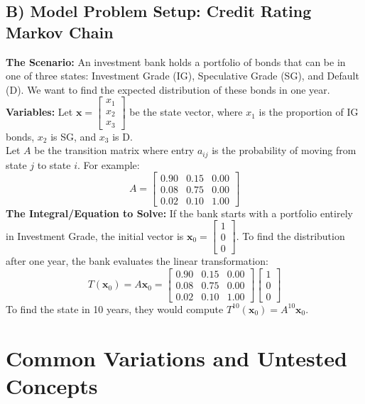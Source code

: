 \documentclass[11pt]{article}
\begin{document}
\subsection{B) Model Problem Setup: Credit Rating Markov Chain}
\textbf{The Scenario:} An investment bank holds a portfolio of bonds that can be in one of three states: Investment Grade (IG), Speculative Grade (SG), and Default (D). We want to find the expected distribution of these bonds in one year.
\textbf{Variables:}
Let $\mathbf{x} = \begin{bmatrix} x_1 \\ x_2 \\ x_3 \end{bmatrix}$ be the state vector, where $x_1$ is the proportion of IG bonds, $x_2$ is SG, and $x_3$ is D. \\
Let $A$ be the transition matrix where entry $a_{ij}$ is the probability of moving from state $j$ to state $i$.
For example:
\[ A = \begin{bmatrix} 0.90 & 0.15 & 0.00 \\ 0.08 & 0.75 & 0.00 \\ 0.02 & 0.10 & 1.00 \end{bmatrix} \]
\textbf{The Integral/Equation to Solve:}
If the bank starts with a portfolio entirely in Investment Grade, the initial vector is $\mathbf{x}_0 = \begin{bmatrix} 1 \\ 0 \\ 0 \end{bmatrix}$. To find the distribution after one year, the bank evaluates the linear transformation:
\[ T(\mathbf{x}_0) = A\mathbf{x}_0 = \begin{bmatrix} 0.90 & 0.15 & 0.00 \\ 0.08 & 0.75 & 0.00 \\ 0.02 & 0.10 & 1.00 \end{bmatrix} \begin{bmatrix} 1 \\ 0 \\ 0 \end{bmatrix} \]
To find the state in 10 years, they would compute $T^{10}(\mathbf{x}_0) = A^{10}\mathbf{x}_0$.

\section{Common Variations and Untested Concepts}
\end{document}
